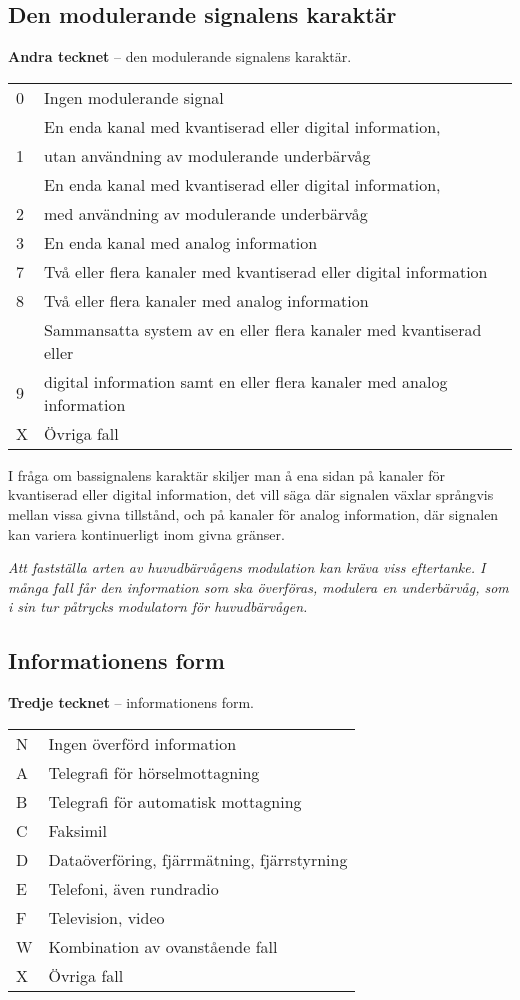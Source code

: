 \subsection{Den modulerande signalens karaktär}
\textbf{Andra tecknet} -- den modulerande signalens karaktär.\\[1ex]
\begin{tabular}{lp{7cm}}
0 &	Ingen modulerande signal \\
  &	En enda kanal med kvantiserad eller digital information, \\
1 &	utan användning av modulerande underbärvåg \\
  &	En enda kanal med kvantiserad eller digital information, \\
2 &	med användning av modulerande underbärvåg \\
3 &	En enda kanal med analog information \\
7 &	Två eller flera kanaler med kvantiserad eller digital information \\
8 &	Två eller flera kanaler med analog information \\
  &	Sammansatta system av en eller flera kanaler med kvantiserad eller \\
9 &	digital information samt en eller flera kanaler med analog information \\
X &	Övriga fall \\[1em]
\end{tabular}

\noindent
I fråga om bassignalens karaktär skiljer man å ena sidan på kanaler för
kvantiserad eller digital information, det vill säga där signalen växlar
språngvis mellan vissa givna tillstånd, och på kanaler för analog information,
där signalen kan variera kontinuerligt inom givna gränser.

\emph{Att fastställa arten av huvudbärvågens modulation kan kräva
  viss eftertanke. I många fall får den information som ska
  överföras, modulera en underbärvåg, som i sin tur påtrycks
  modulatorn för huvudbärvågen.}

\subsection{Informationens form}
\textbf{Tredje tecknet} -- informationens form.\\[1ex]
\begin{tabular}{lp{7cm}}
N &	Ingen överförd information \\
A &	Telegrafi för hörselmottagning \\
B &	Telegrafi för automatisk mottagning \\
C &	Faksimil \\
D &	Dataöverföring, fjärrmätning, fjärrstyrning \\
E &	Telefoni, även rundradio \\
F &	Television, video \\
W &	Kombination av ovanstående fall \\
X &	Övriga fall \\[1em]
\end{tabular}

